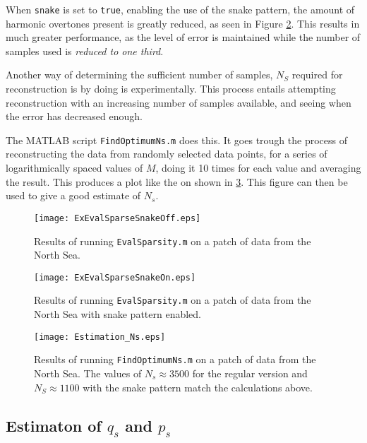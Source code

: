 \documentclass[Main]{subfiles}
\begin{document}
		When \texttt{snake} is set to \texttt{true}, enabling the use of the snake pattern, the amount of harmonic overtones present is greatly reduced, as seen in Figure \ref{fig:ExEvalSparseSnakeOn}.
		This results in much greater performance, as the level of error is maintained while the number of samples used is \emph{reduced to one third}. 

		Another way of determining the sufficient number of samples, $N_S$ required for reconstruction is by doing is experimentally.
		This process entails attempting reconstruction with an increasing number of samples available, and seeing when the error has decreased enough.

		The MATLAB script \texttt{FindOptimumNs.m} does this.
		It goes trough the process of reconstructing the data from randomly selected data points, for a series of logarithmically spaced values of $M$, doing it 10 times for each value and averaging the result.
		This produces a plot like the on shown in \ref{fig:Estimation_Ns}.
		This figure can then be used to give a good estimate of $N_s$.

		\begin{figure}[H]
			\centering 
			\texttt{[image: ExEvalSparseSnakeOff.eps]}
			\caption{
				Results of running \texttt{EvalSparsity.m} on a patch of data from the North Sea.}
			\label{fig:ExEvalSparseSnakeOff}
		\end{figure}

		\begin{figure}[H]
			\centering 
			\texttt{[image: ExEvalSparseSnakeOn.eps]}
			\caption{
				Results of running \texttt{EvalSparsity.m} on a patch of data from the North Sea with snake pattern enabled.}
			\label{fig:ExEvalSparseSnakeOn}
		\end{figure}

		\begin{figure}[H]
			\centering 
			\texttt{[image: Estimation\_Ns.eps]}
			\caption{
				Results of running \texttt{FindOptimumNs.m} on a patch of data from the North Sea. The values of $N_s \approx 3500$ for the regular version and $N_S \approx 1100$ with the snake pattern match the calculations above.}
			\label{fig:Estimation_Ns}
		\end{figure}



	

	\subsection{Estimaton of $q_s$ and $p_s$} %
	\label{sub:estimaton_of_q_s_and_p_s_}
\end{document}
